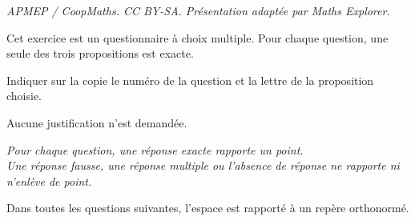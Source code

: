 \documentclass[10pt]{article}
\begin{document}
\noindent\textit{APMEP / CoopMaths. CC BY-SA. Présentation adaptée par Maths Explorer.}\par\medskip
\medskip

Cet exercice est un questionnaire à choix multiple. Pour chaque question, une seule des trois propositions est exacte.

Indiquer sur la copie le numéro de la question et la lettre de la proposition
choisie.

Aucune justification n'est demandée.

\medskip

\emph{Pour chaque question, une réponse exacte rapporte un point.\\
Une réponse fausse, une réponse multiple ou l'absence de réponse ne rapporte ni n'enlève de point.}

\medskip

Dans toutes les questions suivantes, l'espace est rapporté à un repère orthonormé.

\medskip
\end{document}
